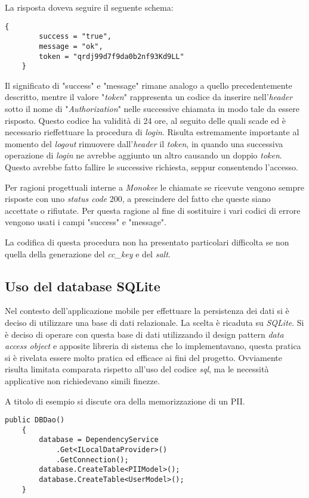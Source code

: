 La risposta doveva seguire il seguente schema:
\begin{lstlisting}[caption={Json risposta token}]
    {
        success = "true",
        message = "ok",
        token = "qrdj99d7f9da0b2nf93Kd9LL"
    }
\end{lstlisting}

Il significato di "success" e "message" rimane analogo a quello precedentemente descritto, mentre il valore "\emph{token}" rappresenta un codice da inserire nell'\emph{header} sotto il nome di "\emph{Authorization}" nelle successive chiamata in modo tale da essere risposto. Questo codice ha validità di 24 ore, al seguito delle quali scade ed è necessario rieffettuare la procedura di \emph{login}. Risulta estremamente importante al momento del \emph{logout} rimuovere dall'\emph{header} il \emph{token}, in quando una successiva operazione di \emph{login} ne avrebbe aggiunto un altro causando un doppio \emph{token}. Questo avrebbe fatto fallire le successive richiesta, seppur consentendo l'accesso.

Per ragioni progettuali interne a \emph{Monokee} le chiamate se ricevute vengono sempre risposte con uno \emph{status code} 200, a prescindere del fatto che queste siano accettate o rifiutate. Per questa ragione al fine di sostituire i vari codici di errore vengono usati i campi "success" e "message". 

La codifica di questa procedura non ha presentato particolari difficolta se non quella della generazione del \emph{cc\_key} e del \emph{salt}. 

\subsection{Uso del database SQLite}

Nel contesto dell'applicazione mobile per effettuare la persistenza dei dati si è deciso di utilizzare una base di dati relazionale. La scelta è ricaduta su \emph{SQLite}. Si è deciso di operare con questa base di dati utilizzando il design pattern \emph{data access object} e apposite libreria di sistema che lo implementavano, questa pratica si è rivelata essere molto pratica ed efficace ai fini del progetto. Ovviamente risulta limitata comparata rispetto all'uso del codice \emph{sql}, ma le necessità applicative non richiedevano simili finezze.

A titolo di esempio si discute ora della memorizzazione di un PII.

\begin{lstlisting}[caption={codice creazione DAO}]
    public DBDao()
    {
        database = DependencyService
            .Get<ILocalDataProvider>()
            .GetConnection();
        database.CreateTable<PIIModel>();
        database.CreateTable<UserModel>();
    }
\end{lstlisting}

